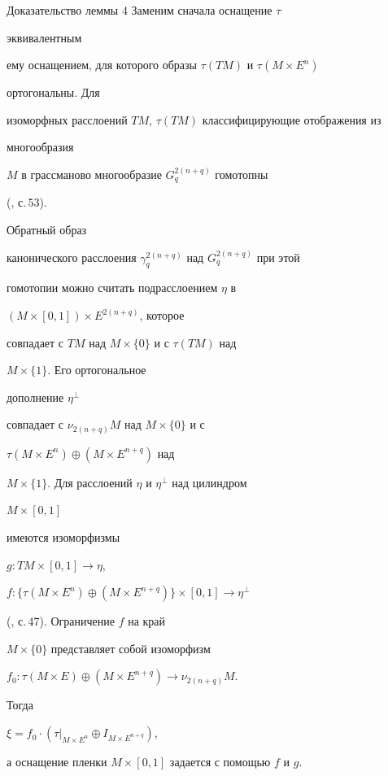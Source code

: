 \begin{pf*}{Доказательство леммы 4} Заменим сначала оснащение $\tau$ 


эквивалентным 


ему оснащением, для которого образы $\tau(TM)$ и $\tau(M\times E^n)$ 


ортогональны. Для 


изоморфных расслоений $TM$, $\tau(TM)$ классифицирующие отображения из 


многообразия 


$M$ в грассманово многообразие $G_q^{2(n+q)}$ гомотопны 


(\cite{Hm}, с.\,53). 


Обратный образ 


канонического расслоения $\gamma_q^{2(n+q)}$ над $G_q^{2(n+q)}$ при этой 


гомотопии можно считать подрасслоением $\eta$ в 


$(M\times[0,1])\times E^{2(n+q)}$, которое 


совпадает с $TM$ над $M\times\{0\}$ и с $\tau(TM)$ над 


$M\times\{1\}$. Его ортогональное 


дополнение $\eta^{\perp}$ 


совпадает с $\nu_{2(n+q)}M$ над $M\times\{0\}$ и с 


$\tau(M\times E^n)\oplus(M\times E^{n+q})$ над 


$M\times\{1\}$. Для расслоений $\eta$ и $\eta^{\perp}$ над цилиндром 


$M\times[0,1]$ 


имеются изоморфизмы 


$g:TM\times[0,1]\to\eta$, 


$f:\{\tau(M\times E^n)\oplus(M\times E^{n+q})\}\times[0,1]\to\eta^{\perp}$ 


(\cite{Hm}, с.\,47). Ограничение $f$ на край 


$M\times\{0\}$ представляет собой изоморфизм 


$f_0:\tau(M\times E)\oplus(M\times E^{n+q})\to\nu_{2(n+q)}M$. 


Тогда 


$\xi=f_0\cdot(\left.\tau\right|_{M\times E^n}\oplus I_{M\times E^{n+q}})$, 


а оснащение пленки $M\times[0,1]$ задается с помощью $f$ и $g$. 


\end{pf*} 


